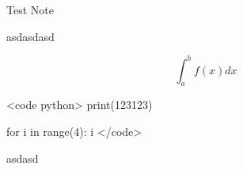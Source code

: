 \documentclass[a4paper,12pt,twoside]{article}
\begin{document}


\newpage

\tableofcontents


\parindent=0pt
\parskip=6pt

\newpage


Test Note

\par

asdasdasd

\par

$$\int_a^b f(x) dx$$

\par

<code python> print(123123)

\par

for i in range(4):     i </code>

\par

asdasd
\end{document}
